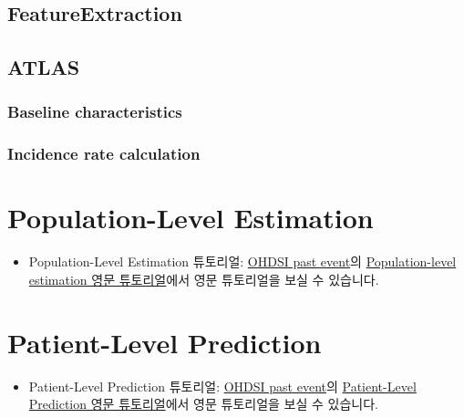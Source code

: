 \documentclass[]{book}
\providecommand{\tightlist}{%
  \setlength{\itemsep}{0pt}\setlength{\parskip}{0pt}}
\begin{document}
\hypertarget{featureextraction}{%
\section{FeatureExtraction}\label{featureextraction}}

\hypertarget{atlas-1}{%
\section{ATLAS}\label{atlas-1}}

\hypertarget{baseline-characteristics}{%
\subsection{Baseline characteristics}\label{baseline-characteristics}}

\hypertarget{incidence-rate-calculation}{%
\subsection{Incidence rate calculation}\label{incidence-rate-calculation}}

\hypertarget{population-level-estimation}{%
\chapter{Population-Level Estimation}\label{population-level-estimation}}

\begin{itemize}
\tightlist
\item
  Population-Level Estimation 튜토리얼: \href{https://www.ohdsi.org/past-events/}{OHDSI past event}의 \href{https://www.ohdsi.org/past-events/population-level-estimation}{Population-level estimation 영문 튜토리얼}에서 영문 튜토리얼을 보실 수 있습니다.
\end{itemize}

\hypertarget{patient-level-prediction}{%
\chapter{Patient-Level Prediction}\label{patient-level-prediction}}

\begin{itemize}
\tightlist
\item
  Patient-Level Prediction 튜토리얼: \href{https://www.ohdsi.org/past-events/}{OHDSI past event}의 \href{https://www.ohdsi.org/past-events/patient-level-prediction}{Patient-Level Prediction 영문 튜토리얼}에서 영문 튜토리얼을 보실 수 있습니다.
\end{itemize}
\end{document}
